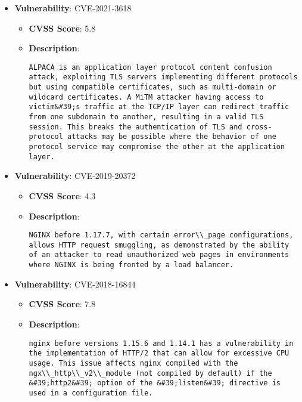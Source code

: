 \documentclass{article}
\begin{document}
\begin{itemize}
        \item \textbf{Vulnerability}: CVE-2021-3618
        \begin{itemize}
            \item \textbf{CVSS Score}:  5.8 
            \item \textbf{Description}:
            \parbox[t]{0.9\linewidth}{
                \verb|ALPACA is an application layer protocol content confusion attack, exploiting TLS servers implementing different protocols but using compatible certificates, such as multi-domain or wildcard certificates. A MiTM attacker having access to victim&#39;s traffic at the TCP/IP layer can redirect traffic from one subdomain to another, resulting in a valid TLS session. This breaks the authentication of TLS and cross-protocol attacks may be possible where the behavior of one protocol service may compromise the other at the application layer.|
            }
        \end{itemize}
    
        \item \textbf{Vulnerability}: CVE-2019-20372
        \begin{itemize}
            \item \textbf{CVSS Score}:  4.3 
            \item \textbf{Description}:
            \parbox[t]{0.9\linewidth}{
                \verb|NGINX before 1.17.7, with certain error\\_page configurations, allows HTTP request smuggling, as demonstrated by the ability of an attacker to read unauthorized web pages in environments where NGINX is being fronted by a load balancer.|
            }
        \end{itemize}
    
        \item \textbf{Vulnerability}: CVE-2018-16844
        \begin{itemize}
            \item \textbf{CVSS Score}:  7.8 
            \item \textbf{Description}:
            \parbox[t]{0.9\linewidth}{
                \verb|nginx before versions 1.15.6 and 1.14.1 has a vulnerability in the implementation of HTTP/2 that can allow for excessive CPU usage. This issue affects nginx compiled with the ngx\\_http\\_v2\\_module (not compiled by default) if the &#39;http2&#39; option of the &#39;listen&#39; directive is used in a configuration file.|
            }
        \end{itemize}
    

\end{itemize}
\end{document}
